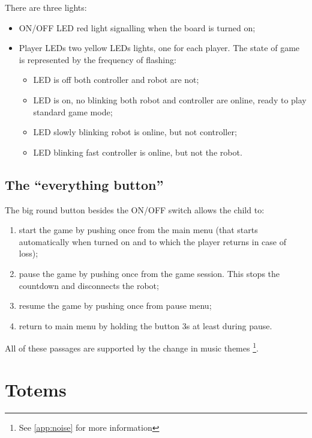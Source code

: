 \documentclass[a4paper,twoside]{book}
\begin{document}
There are three lights:
\begin{itemize}
\item ON/OFF LED \textemdash red light signalling when the board is turned on;
\item Player LEDs \textemdash two yellow LEDs lights, one for each player. The state of game is represented by the frequency of flashing:
	\begin{itemize}
	\item LED is off \textemdash both controller and robot are not;
	\item LED is on, no blinking \textemdash both robot and controller are online, ready to play standard game mode;
	\item LED slowly blinking \textemdash robot is online, but not controller;
	\item LED blinking fast \textemdash controller is online, but not the robot.
	\end{itemize}
\end{itemize}

\subsection{The \textquotedblleft everything button\textquotedblright}

The big round button besides the ON/OFF switch allows the child to:
\begin{enumerate}
\item start the game \textemdash by pushing once from the main menu (that starts automatically when turned on and to which the player returns in case of loss);
\item pause the game \textemdash by pushing once from the game session. This stops the countdown and disconnects the robot;
\item resume the game \textemdash by pushing once from pause menu;
\item return to main menu \textemdash by holding the button 3s at least during pause.
\end{enumerate}
All of these passages are supported by the change in music themes 
\footnote {See \autoref{app:noise} for more information}.


\section{Totems}
\end{document}
